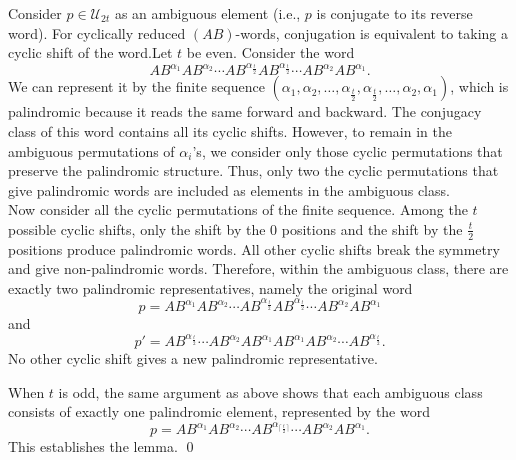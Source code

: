 \documentclass[a4paper,12pt]{amsart}
\renewenvironment{proof}{{\bfseries Proof.}}{\qed}
\numberwithin{equation}{section}
\theoremstyle{definition}
\newcommand{\n}{\newline}
\numberwithin{equation}{section}
\begin{document}
\begin{proof}
 Consider \(p \in \mathcal{U}_{2t}\) as an ambiguous element (i.e., \(p\) is conjugate to its reverse word). For cyclically reduced \((AB)\)-words, conjugation is equivalent to taking a cyclic shift of the word.\n Let $t$ be even. Consider the word
  $$
  AB^{\alpha_1} AB^{\alpha_2} \cdots AB^{\alpha_{\frac{t}{2}}} AB^{\alpha_{\frac{t}{2}}} \cdots AB^{\alpha_2} AB^{\alpha_1}.
  $$
  We can represent it by the finite sequence 
  \((\alpha_1, \alpha_2, \ldots, \alpha_{\frac{t}{2}}, \alpha_{\frac{t}{2}}, \ldots, \alpha_2, \alpha_1)\), which is palindromic because it reads the same forward and backward. The conjugacy class of this word contains all its cyclic shifts. However, to remain in the ambiguous permutations of $\alpha_i$'s, we consider only those cyclic permutations that preserve the palindromic structure. Thus, only two the cyclic permutations that give palindromic words are included as elements in the ambiguous class.
   \\Now consider all the cyclic permutations of the finite sequence. Among the $t$ possible cyclic shifts, only the shift by the $0$ positions and the shift by the $\frac{t}{2}$ positions produce palindromic words. All other cyclic shifts break the symmetry and give non-palindromic words. Therefore, within the ambiguous class, there are exactly two palindromic representatives, namely the original word $$p=AB^{\alpha_1}AB^{\alpha_2}\cdots AB^{\alpha_{\frac{t}{2}}}AB^{\alpha_\frac{t}{2}}\cdots AB^{\alpha_2}AB^{\alpha_1}$$ and $$p'=AB^{\alpha_{\frac{t}{2}}}\cdots AB^{\alpha_{2}}AB^{\alpha_1}AB^{\alpha_1}AB^{\alpha_2}\cdots AB^{\alpha_{\frac{t}{2}}}.$$ No other cyclic shift gives a new palindromic representative.
   
   When $t$ is odd, the same argument as above shows that each ambiguous class consists of exactly one palindromic element, represented by the word
   $$p=AB^{\alpha_1}AB^{\alpha_2}\cdots AB^{\alpha_{\lceil \frac{t}{2}\rceil}}\cdots AB^{\alpha_2}AB^{\alpha_1}.$$
This establishes the lemma. 
\end{proof}
\end{document}
